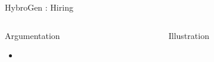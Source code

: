 \begin{Frame}{HybroGen : Hiring}
 \begin{columns}[t]
  \begin{column}{\BW}
    \begin{block}{Argumentation}
      \begin{itemize}
        \item
      \end{itemize}
    \end{block}
  \end{column}
  \begin{column}{\BW}
    \begin{block}{Illustration}
    \end{block}
  \end{column}

 \end{columns}
\end{Frame}
